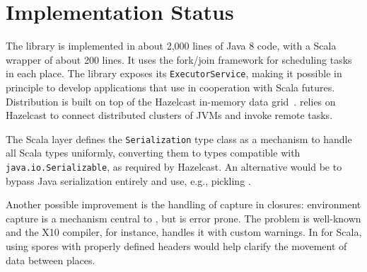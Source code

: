 \section{Implementation Status}
\label{sec:serialization}

The \apgas library is implemented in about 2,000 lines of Java 8 code, with a
Scala wrapper of about 200 lines. It uses the fork/join framework for
scheduling tasks in each place. The library exposes its
\lstinline{ExecutorService}, making it possible in principle to develop applications that
use \apgas in cooperation with Scala futures.
Distribution is built on top of the Hazelcast in-memory
data grid~\cite{hazelcast}. \apgas relies on Hazelcast to
connect distributed clusters of JVMs and invoke remote tasks. 

The Scala layer defines the \lstinline{Serialization} type class as a mechanism
to handle all Scala types uniformly, converting them to types
compatible with \lstinline{java.io.Serializable}, as required by Hazelcast. An
alternative would be to bypass Java serialization entirely and use, e.g.,
pickling
\cite{MillerETAL13InstantPicklesGeneratingObjectorientedPicklerCombinators}.

Another possible improvement is the handling of capture in closures:
environment capture is a mechanism central to \apgas, but is error prone. The
problem is well-known and the X10 compiler, for instance, handles it with
custom warnings. In \apgas for Scala, using spores with properly defined
headers
\cite{MillerHallerOdersky14SporesTypebasedFoundationClosuresAgeConcurrency}
would help clarify the movement of data between places.




